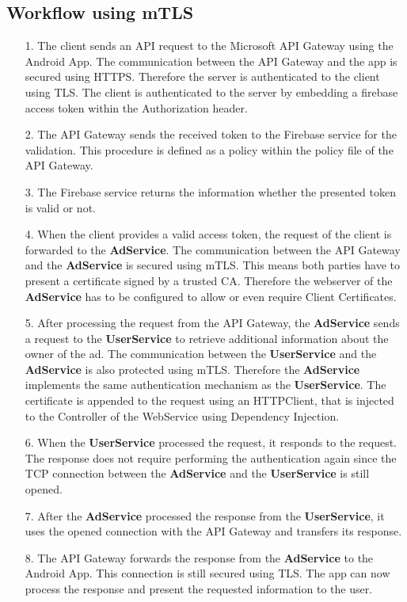 \subsection{Workflow using mTLS}
\begin{enumerate}
	\item[1.] The client sends an API request to the Microsoft API Gateway using the Android App.
		The communication between the API Gateway and the app is secured using HTTPS.
		Therefore the server is authenticated to the client using TLS.
		The client is authenticated to the server by embedding a firebase access token within the Authorization header.
	\item[2.] The API Gateway sends the received token to the Firebase service for the validation.
		This procedure is defined as a policy within the policy file of the API Gateway.
		\newpage
	\item[3.] The Firebase service returns the information whether the presented token is valid or not.
	\item[4.] When the client provides a valid access token, the request of the client is forwarded to the \textbf{AdService}.
		The communication between the API Gateway and the \textbf{AdService} is secured using mTLS.
		This means both parties have to present a certificate signed by a trusted CA.
		Therefore the webserver of the \textbf{AdService} has to be configured to allow or even require Client Certificates.
	\item[5.] After processing the request from the API Gateway, the \textbf{AdService} sends a request to the \textbf{UserService} to retrieve additional information about the owner of the ad.
		The communication between the \textbf{UserService} and the \textbf{AdService} is also protected using mTLS.
		Therefore the \textbf{AdService} implements the same authentication mechanism as the \textbf{UserService}.
		The certificate is appended to the request using an HTTPClient, that is injected to the Controller of the WebService using Dependency Injection.
	\item[6.] When the \textbf{UserService} processed the request, it responds to the request.
		The response does not require performing the authentication again since the TCP connection between the \textbf{AdService} and the \textbf{UserService} is still opened.
	\item[7.] After the \textbf{AdService} processed the response from the \textbf{UserService}, it uses the opened connection with the API Gateway and transfers its response.
	\item[8.] The API Gateway forwards the response from the \textbf{AdService} to the Android App.
		This connection is still secured using TLS. 
		The app can now process the response and present the requested information to the user.
\end{enumerate}

